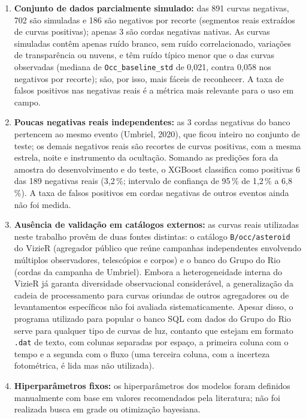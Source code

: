 \begin{enumerate}
	\item \textbf{Conjunto de dados parcialmente simulado:} das 891 curvas negativas, 702 são simuladas e 186 são negativos por recorte (segmentos reais extraídos de curvas positivas); apenas 3 são cordas negativas nativas. As curvas simuladas contêm apenas ruído branco, sem ruído correlacionado, variações de transparência ou nuvens, e têm ruído típico menor que o das curvas observadas (mediana de \texttt{Occ\_baseline\_std} de 0,021, contra 0,058 nos negativos por recorte); são, por isso, mais fáceis de reconhecer. A taxa de falsos positivos nas negativas reais é a métrica mais relevante para o uso em campo.

	\item \textbf{Poucas negativas reais independentes:} as 3 cordas negativas do banco pertencem ao mesmo evento (Umbriel, 2020), que ficou inteiro no conjunto de teste; os demais negativos reais são recortes de curvas positivas, com a mesma estrela, noite e instrumento da ocultação. Somando as predições fora da amostra do desenvolvimento e do teste, o XGBoost classifica como positivas 6 das 189 negativas reais (3,2\,\%; intervalo de confiança de 95\,\% de 1,2\,\% a 6,8\,\%). A taxa de falsos positivos em cordas negativas de outros eventos ainda não foi medida.

	\item \textbf{Ausência de validação em catálogos externos:} as curvas reais utilizadas neste trabalho provêm de duas fontes distintas: o catálogo \texttt{B/occ/asteroid} do VizieR (agregador público que reúne campanhas independentes envolvendo múltiplos observadores, telescópios e corpos) e o banco do Grupo do Rio (cordas da campanha de Umbriel). Embora a heterogeneidade interna do VizieR já garanta diversidade observacional considerável, a generalização da cadeia de processamento para curvas oriundas de outros agregadores ou de levantamentos específicos não foi avaliada sistematicamente. Apesar disso, o programa utilizado para popular o banco SQL com dados do Grupo do Rio serve para qualquer tipo de curvas de luz, contanto que estejam em formato \texttt{.dat} de texto, com colunas separadas por espaço, a primeira coluna com o tempo e a segunda com o fluxo (uma terceira coluna, com a incerteza fotométrica, é lida mas não utilizada).

	\item \textbf{Hiperparâmetros fixos:} os hiperparâmetros dos modelos foram definidos manualmente com base em valores recomendados pela literatura; não foi realizada busca em grade ou otimização bayesiana.


\end{enumerate}

